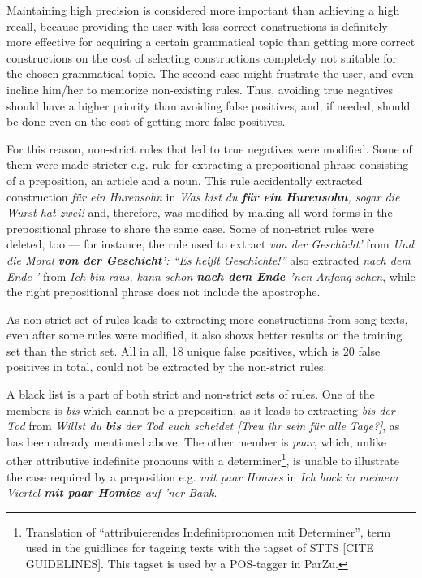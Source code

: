 Maintaining high precision is considered more important than achieving a high recall, because providing the user with less correct constructions is definitely more effective for acquiring a certain grammatical topic than getting more correct constructions on the cost of selecting constructions completely not suitable for the chosen grammatical topic. The second case might frustrate the user, and even incline him/her to memorize non-existing rules. Thus, avoiding true negatives should have a higher priority than avoiding false positives, and, if needed, should be done even on the cost of getting more false positives.

For this reason, non-strict rules that led to true negatives were modified. Some of them were made stricter e.g. rule for extracting a prepositional phrase consisting of a preposition, an article and a noun. This rule accidentally extracted construction \textit{für ein Hurensohn} in \textit{Was bist du \textbf{für ein Hurensohn}, sogar die Wurst hat zwei!} and, therefore, was modified by making all word forms in the prepositional phrase to share the same case. Some of non-strict rules were deleted, too --- for instance, the rule used to extract \textit{von der Geschicht'} from \textit{Und die Moral \textbf{von der Geschicht'}: ``Es heißt Geschichte!''} also extracted \textit{nach dem Ende '} from \textit{Ich bin raus, kann schon \textbf{nach dem Ende '}nen Anfang sehen}, while the right prepositional phrase does not include the apostrophe. 

As non-strict set of rules leads to extracting more constructions from song texts, even after some rules were modified, it also shows better results on the training set than the strict set. All in all, 18 unique false positives, which is 20 false positives in total, could not be extracted by the non-strict rules.

A black list is a part of both strict and non-strict sets of rules. One of the members is \textit{bis} which cannot be a preposition, as it leads to extracting \textit{bis der Tod} from \textit{Willst du \textbf{bis} der Tod euch scheidet [Treu ihr sein für alle Tage?]}, as has been already mentioned above. The other member is \textit{paar}, which, unlike other attributive indefinite pronouns with a determiner\footnote{Translation of ``attribuierendes Indefinitpronomen mit Determiner'', term used in the guidlines for tagging texts with the tagset of STTS [CITE GUIDELINES]. This tagset is used by a POS-tagger in ParZu.}, is unable to illustrate the case required by a preposition e.g. \textit{mit paar Homies} in \textit{Ich hock in meinem Viertel \textbf{mit paar Homies} auf 'ner Bank}.

